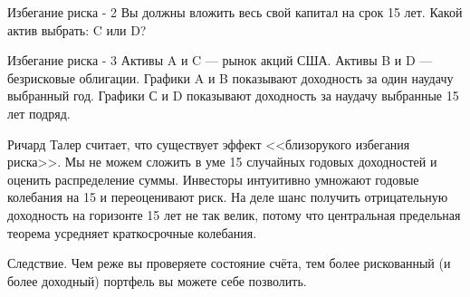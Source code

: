 \documentclass{beamer}
\begin{document}
\begin{frame}{Избегание риска - 2}
\justify
Вы должны вложить весь свой капитал на срок 15 лет. Какой актив выбрать: C или D?

\centering
{}
\end{frame}



\begin{frame}{Избегание риска - 3}
\justify
Активы A и C --- рынок акций США. Активы B и D --- безрисковые облигации. Графики A и B показывают доходность за один наудачу выбранный год. Графики С и D показывают доходность за наудачу выбранные 15 лет подряд.

\justify
Ричард Талер считает, что существует эффект <<близорукого избегания риска>>. Мы не можем сложить в уме 15 случайных годовых доходностей и оценить распределение суммы. Инвесторы интуитивно умножают годовые колебания на 15 и переоценивают риск. На деле шанс получить отрицательную доходность на горизонте 15 лет не так велик, потому что центральная предельная теорема усредняет краткосрочные колебания.

\justify
Следствие. Чем реже вы проверяете состояние счёта, тем более рискованный (и более доходный) портфель вы можете себе позволить.
\end{frame}
\end{document}
